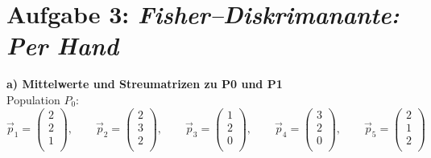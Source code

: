 \section*{Aufgabe 3: \emph{Fisher--Diskrimanante: Per Hand}}
\textbf{a) Mittelwerte und Streumatrizen zu P0 und P1} \\
Population $P_0$:
\[
\vec{p}_1 =
\left(
\begin {array} {c}

2 \\

2 \\

1 \\

\end {array}
\right)
, \qquad
\vec{p}_2 =
\left(
\begin {array} {c}

2 \\

3 \\

2 \\

\end {array}
\right)
, \qquad
\vec{p}_3 =
\left(
\begin {array} {c}

1 \\

2 \\

0 \\

\end {array}
\right)
, \qquad
\vec{p}_4 =
\left(
\begin {array} {c}

3 \\

2 \\

0 \\

\end {array}
\right)
, \qquad
\vec{p}_5 =
\left(
\begin {array} {c}

2 \\

1 \\

2 \\

\end {array}
\right)
\]
\\
